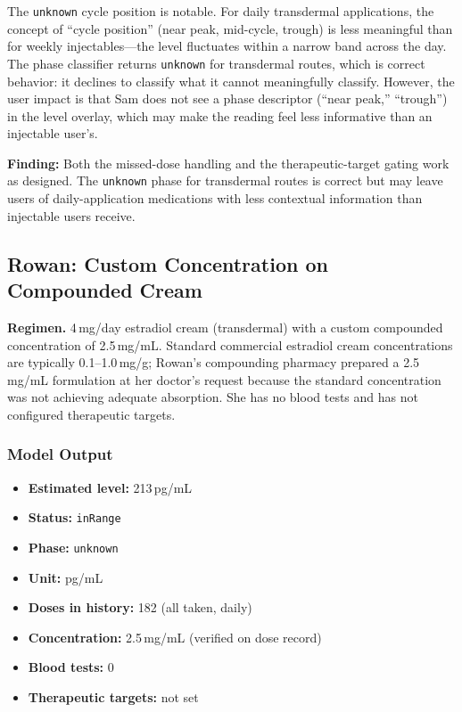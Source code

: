 \documentclass[11pt,a4paper]{article}
\newcommand{\code}[1]{\texttt{\small #1}}
\begin{document}
The \code{unknown} cycle position is notable. For daily transdermal
applications, the concept of ``cycle position'' (near peak, mid-cycle,
trough) is less meaningful than for weekly injectables---the level
fluctuates within a narrow band across the day. The phase classifier returns
\code{unknown} for transdermal routes, which is correct behavior: it
declines to classify what it cannot meaningfully classify. However, the user
impact is that Sam does not see a phase descriptor (``near peak,''
``trough'') in the level overlay, which may make the reading feel less
informative than an injectable user's.

\textbf{Finding:} Both the missed-dose handling and the therapeutic-target
gating work as designed. The \code{unknown} phase for transdermal routes is
correct but may leave users of daily-application medications with less
contextual information than injectable users receive.

\subsection{Rowan: Custom Concentration on Compounded Cream}
\label{sec:rowan}

\textbf{Regimen.} 4\,mg/day estradiol cream (transdermal) with a custom
compounded concentration of 2.5\,mg/mL. Standard commercial estradiol cream
concentrations are typically 0.1--1.0\,mg/g; Rowan's compounding pharmacy
prepared a 2.5\,mg/mL formulation at her doctor's request because the
standard concentration was not achieving adequate absorption. She has no
blood tests and has not configured therapeutic targets.

\subsubsection{Model Output}

\begin{itemize}[nosep,leftmargin=1.4em]
\item \textbf{Estimated level:} 213\,pg/mL
\item \textbf{Status:} \code{inRange}
\item \textbf{Phase:} \code{unknown}
\item \textbf{Unit:} pg/mL
\item \textbf{Doses in history:} 182 (all taken, daily)
\item \textbf{Concentration:} 2.5\,mg/mL (verified on dose record)
\item \textbf{Blood tests:} 0
\item \textbf{Therapeutic targets:} not set
\end{itemize}
\end{document}
